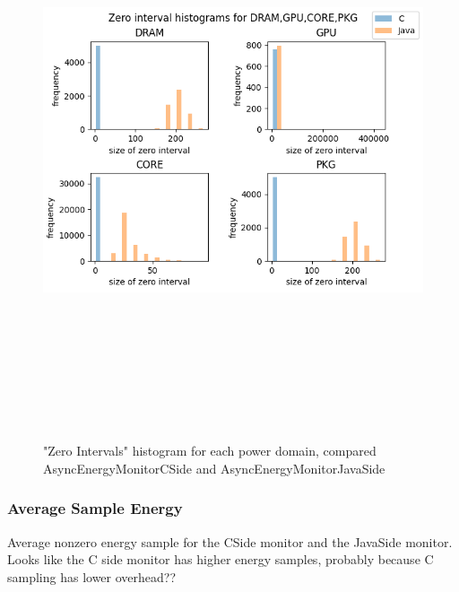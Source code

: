 \documentclass{article}
\begin{document}
    \begin{figure}[H]
    	\centering
    	\includegraphics[width=17cm,height=17cm,keepaspectratio]{AsyncMonitorCompares/zero-intervals.png}
    	\caption{"Zero Intervals" histogram for each power domain, compared AsyncEnergyMonitorCSide and AsyncEnergyMonitorJavaSide}
    	\label{fig:xalan-PKG-Time-scatter}
    \end{figure}

\subsubsection{Average Sample Energy}
    Average nonzero energy sample for the CSide monitor and the JavaSide monitor. Looks like the C side monitor
    has higher energy samples, probably because C sampling has lower overhead??
\end{document}
